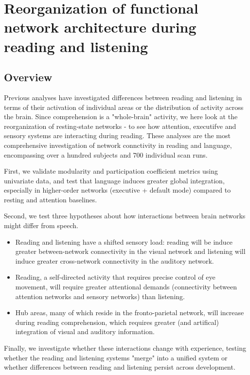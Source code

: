 \chapter{Reorganization of functional network architecture during reading and listening}

\section{Overview}

Previous analyses have investigated differences between reading and listening in terms of their activation of individual areas or the distribution of activity across the brain. Since comprehension is a "whole-brain" activity, we here look at the reorganization of resting-state networks - to see how attention, executifve and sensory systems are interacting during reading.  These analyses are the most comprehensive investigation of network connctivity in reading and language, encompassing over a hundred subjects and 700 individual scan runs. 

First, we validate modularity and participation coefficient metrics using univariate data, and test that language induces greater global integration, especially in higher-order networks (executive + default mode) compared to resting and attention baselines.

Second, we test three hypotheses about how interactions between brain networks might differ from speech.
\begin{itemize}
	\item Reading and listening have a shifted sensory load: reading will be induce greater between-network connectivity in the visual network and listening will induce greater cross-network connectivity in the auditory network.  
	\item Reading, a self-directed activity that requires precise control of eye movement, will require greater attentional demands (connectivity between attention networks and sensory networks) than listening. 
	\item Hub areas, many of which reside in the fronto-parietal network, will increase during reading comprehension, which requires greater (and artifical) integration of visual and auditory information.
\end{itemize}

Finally, we investigate whether these interactions change with experience, testing whether the reading and listening systems "merge" into a unified system or whether differences between reading and listening persist across development.

